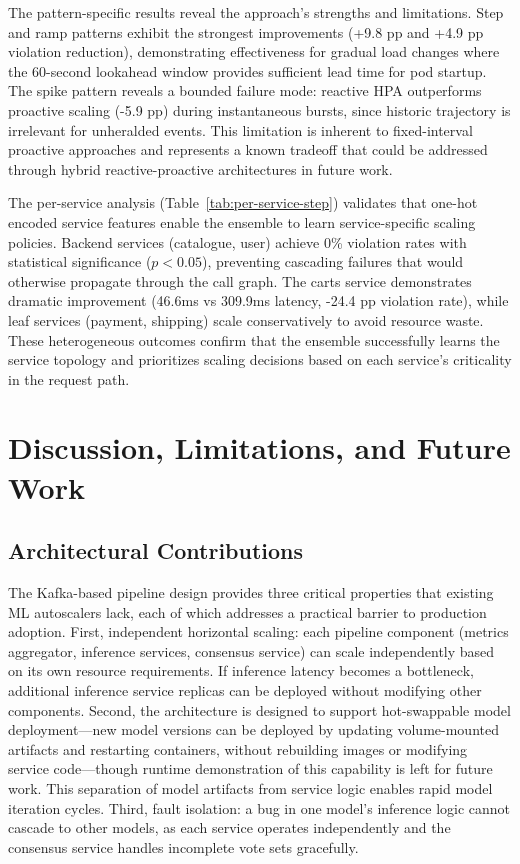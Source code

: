\documentclass[conference]{IEEEtran}
\begin{document}
The pattern-specific results reveal the approach's strengths and limitations. Step and ramp patterns exhibit the strongest improvements (+9.8 pp and +4.9 pp violation reduction), demonstrating effectiveness for gradual load changes where the 60-second lookahead window provides sufficient lead time for pod startup. The spike pattern reveals a bounded failure mode: reactive HPA outperforms proactive scaling (-5.9 pp) during instantaneous bursts, since historic trajectory is irrelevant for unheralded events. This limitation is inherent to fixed-interval proactive approaches and represents a known tradeoff that could be addressed through hybrid reactive-proactive architectures in future work.

The per-service analysis (Table~\ref{tab:per-service-step}) validates that one-hot encoded service features enable the ensemble to learn service-specific scaling policies. Backend services (catalogue, user) achieve 0\% violation rates with statistical significance ($p < 0.05$), preventing cascading failures that would otherwise propagate through the call graph. The carts service demonstrates dramatic improvement (46.6ms vs 309.9ms latency, -24.4 pp violation rate), while leaf services (payment, shipping) scale conservatively to avoid resource waste. These heterogeneous outcomes confirm that the ensemble successfully learns the service topology and prioritizes scaling decisions based on each service's criticality in the request path.

\section{Discussion, Limitations, and Future Work}

\subsection{Architectural Contributions}

The Kafka-based pipeline design provides three critical properties that existing ML autoscalers lack, each of which addresses a practical barrier to production adoption. First, independent horizontal scaling: each pipeline component (metrics aggregator, inference services, consensus service) can scale independently based on its own resource requirements. If inference latency becomes a bottleneck, additional inference service replicas can be deployed without modifying other components. Second, the architecture is designed to support hot-swappable model deployment---new model versions can be deployed by updating volume-mounted artifacts and restarting containers, without rebuilding images or modifying service code---though runtime demonstration of this capability is left for future work. This separation of model artifacts from service logic enables rapid model iteration cycles. Third, fault isolation: a bug in one model's inference logic cannot cascade to other models, as each service operates independently and the consensus service handles incomplete vote sets gracefully.
\end{document}
